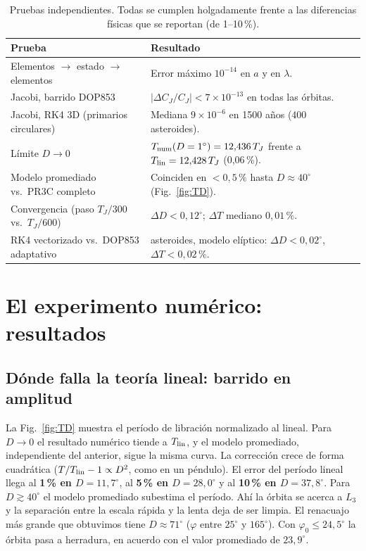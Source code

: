 \documentclass[11pt, a4paper]{article}
\newcommand{\Tlin}{T_{\rm lin}}
\begin{document}
\begin{table}[t]
\centering\small
\caption{Pruebas independientes. Todas se cumplen holgadamente frente a las diferencias físicas que se reportan (de 1--10\,\%).}
\label{tab:ver}
\begin{tabular}{>{\raggedright}p{5.2cm}>{\raggedright\arraybackslash}p{9.6cm}}
\toprule
Prueba & Resultado\\\midrule
Elementos $\to$ estado $\to$ elementos & Error máximo $10^{-14}$ en $a$ y en $\lambda$.\\
Jacobi, barrido DOP853 & $|\Delta C_J/C_J|<7\times10^{-13}$ en todas las órbitas.\\
Jacobi, RK4 3D (primarios circulares) & Mediana $9\times10^{-6}$ en 1500 años (400 asteroides).\\
Límite $D\to0$ & $T_{\rm num}(D=1^\circ)=12{,}436\,T_J$ frente a $\Tlin=12{,}428\,T_J$ (0,06\,\%).\\
Modelo promediado vs.\ PR3C completo & Coinciden en $<0{,}5\,\%$ hasta $D\approx40^\circ$ (Fig.~\ref{fig:TD}).\\
Convergencia (paso $T_J/300$ vs.\ $T_J/600$) & $\Delta D<0{,}12^\circ$; $\Delta T$ mediano $0{,}01\,\%$.\\
RK4 vectorizado vs.\ DOP853 adaptativo & 6 asteroides, modelo elíptico: $\Delta D<0{,}02^\circ$, $\Delta T<0{,}02\,\%$.\\
\bottomrule
\end{tabular}
\end{table}

\section{El experimento numérico: resultados}\label{sec:res}
\subsection{Dónde falla la teoría lineal: barrido en amplitud}
La Fig.~\ref{fig:TD} muestra el período de libración normalizado al lineal. Para $D\to0$ el resultado numérico tiende a $\Tlin$, y el modelo promediado, independiente del anterior, sigue la misma curva. La corrección crece de forma cuadrática ($T/\Tlin-1\propto D^2$, como en un péndulo). El error del período lineal llega al \textbf{1\,\% en $D=11{,}7^\circ$}, al \textbf{5\,\% en $D=28{,}0^\circ$} y al \textbf{10\,\% en $D=37{,}8^\circ$}. Para $D\gtrsim40^\circ$ el modelo promediado subestima el período. Ahí la órbita se acerca a $L_3$ y la separación entre la escala rápida y la lenta deja de ser limpia. El renacuajo más grande que obtuvimos tiene $D\approx71^\circ$ ($\varphi$ entre $25^\circ$ y $165^\circ$). Con $\varphi_0\le24{,}5^\circ$ la órbita pasa a herradura, en acuerdo con el valor promediado de $23{,}9^\circ$.
\end{document}

